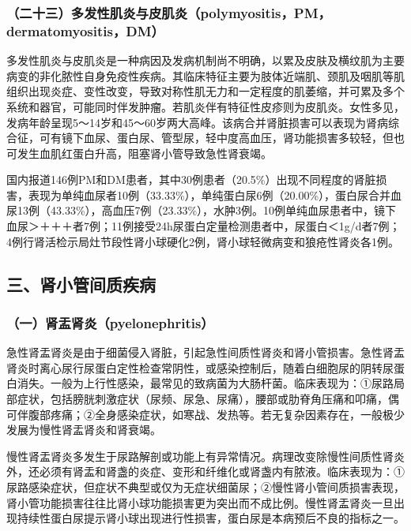 \subsubsection{（二十三）多发性肌炎与皮肌炎（polymyositis，PM，dermatomyositis，DM）}

多发性肌炎与皮肌炎是一种病因及发病机制尚不明确，以累及皮肤及横纹肌为主要病变的非化脓性自身免疫性疾病。其临床特征主要为肢体近端肌、颈肌及咽肌等肌组织出现炎症、变性改变，导致对称性肌无力和一定程度的肌萎缩，并可累及多个系统和器官，可能同时伴发肿瘤。若肌炎伴有特征性皮疹则为皮肌炎。女性多见，发病年龄呈现5～14岁和45～60岁两大高峰。该病合并肾脏损害可以表现为肾病综合征，可有镜下血尿、蛋白尿、管型尿，轻中度高血压，肾功能损害多较轻，但也可发生血肌红蛋白升高，阻塞肾小管导致急性肾衰竭。

国内报道146例PM和DM患者，其中30例患者（20.5\%）出现不同程度的肾脏损害，表现为单纯血尿者10例（33.33\%），单纯蛋白尿6例（20.00\%），蛋白尿合并血尿13例（43.33\%），高血压7例（23.33\%），水肿3例。10例单纯血尿患者中，镜下血尿＞＋＋＋者7例；11例接受24h尿蛋白定量检测患者中，尿蛋白＜1g/d者7例；4例行肾活检示局灶节段性肾小球硬化2例，肾小球轻微病变和狼疮性肾炎各1例。

\protect\hypertarget{text00293.html}{}{}

\subsection{三、肾小管间质疾病}

\subsubsection{（一）肾盂肾炎（pyelonephritis）}

急性肾盂肾炎是由于细菌侵入肾脏，引起急性间质性肾炎和肾小管损害。急性肾盂肾炎时离心尿行尿蛋白定性检查常阴性，或感染控制后，随着白细胞尿的阴转尿蛋白消失。一般为上行性感染，最常见的致病菌为大肠杆菌。临床表现为：①尿路局部症状，包括膀胱刺激症状（尿频、尿急、尿痛），腰部或肋脊角压痛和叩痛，偶可伴腹部疼痛；②全身感染症状，如寒战、发热等。若无复杂因素存在，一般极少发展为慢性肾盂肾炎和肾衰竭。

慢性肾盂肾炎多发生于尿路解剖或功能上有异常情况。病理改变除慢性间质性肾炎外，还必须有肾盂和肾盏的炎症、变形和纤维化或肾盏内有脓液。临床表现为：①尿路感染症状，但症状不典型或仅为无症状细菌尿；②慢性肾小管间质损害表现，肾小管功能损害往往比肾小球功能损害更为突出而不成比例。慢性肾盂肾炎一旦出现持续性蛋白尿提示肾小球出现进行性损害，蛋白尿是本病预后不良的指标之一。

